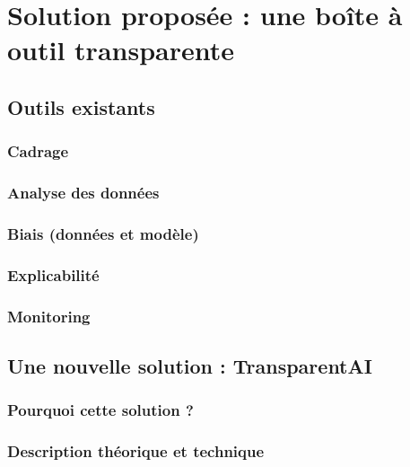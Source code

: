 \documentclass[10pt, french, a4paper]{article}
\begin{document}

\newpage
\section{Solution proposée : une boîte à outil transparente}


\subsection{Outils existants}

\subsubsection{Cadrage}

\subsubsection{Analyse des données}

\subsubsection{Biais (données et modèle)}

\subsubsection{Explicabilité}

\subsubsection{Monitoring}


\subsection{Une nouvelle solution : TransparentAI}

\subsubsection{Pourquoi cette solution ?}

\subsubsection{Description théorique et technique}
\end{document}
